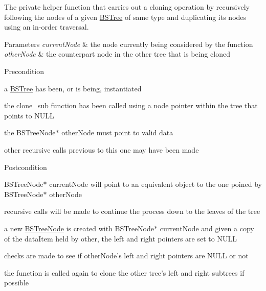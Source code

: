 \-The private helper function that carries out a cloning operation by recursively following the nodes of a given \hyperlink{class_b_s_tree}{\-B\-S\-Tree} of same type and duplicating its nodes using an in-\/order traversal.


\begin{DoxyParams}{\-Parameters}
{\em current\-Node} & the node currently being considered by the function \\
\hline
{\em other\-Node} & the counterpart node in the other tree that is being cloned\\
\hline
\end{DoxyParams}
\begin{DoxyPrecond}{\-Precondition}

\begin{DoxyEnumerate}
\item a \hyperlink{class_b_s_tree}{\-B\-S\-Tree} has been, or is being, instantiated
\item the clone\-\_\-sub function has been called using a node pointer within the tree that points to \-N\-U\-L\-L
\item the \-B\-S\-Tree\-Node$\ast$ other\-Node must point to valid data
\item other recursive calls previous to this one may have been made
\end{DoxyEnumerate}
\end{DoxyPrecond}
\begin{DoxyPostcond}{\-Postcondition}

\begin{DoxyEnumerate}
\item \-B\-S\-Tree\-Node$\ast$ current\-Node will point to an equivalent object to the one poined by \-B\-S\-Tree\-Node$\ast$ other\-Node
\item recursive calls will be made to continue the process down to the leaves of the tree
\end{DoxyEnumerate}
\end{DoxyPostcond}

\begin{DoxyEnumerate}
\item a new \hyperlink{class_b_s_tree_1_1_b_s_tree_node}{\-B\-S\-Tree\-Node} is created with \-B\-S\-Tree\-Node$\ast$ current\-Node and given a copy of the data\-Item held by other, the left and right pointers are set to \-N\-U\-L\-L
\item checks are made to see if other\-Node's left and right pointers are \-N\-U\-L\-L or not
\item the function is called again to clone the other tree's left and right subtrees if possible
\end{DoxyEnumerate}


